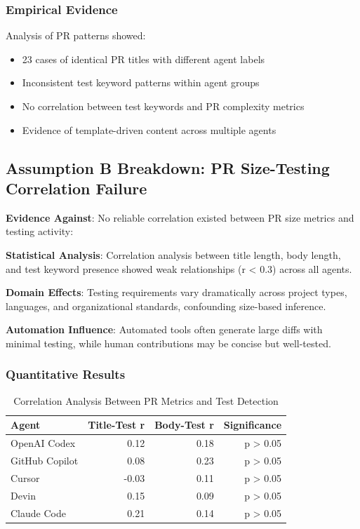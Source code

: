 \documentclass[conference]{IEEEtran}
\begin{document}
\subsubsection{Empirical Evidence}

Analysis of PR patterns showed:
\begin{itemize}
    \item 23 cases of identical PR titles with different agent labels
    \item Inconsistent test keyword patterns within agent groups
    \item No correlation between test keywords and PR complexity metrics
    \item Evidence of template-driven content across multiple agents
\end{itemize}

\subsection{Assumption B Breakdown: PR Size-Testing Correlation Failure}

\textbf{Evidence Against}: No reliable correlation existed between PR size metrics and testing activity:

\textbf{Statistical Analysis}: Correlation analysis between title length, body length, and test keyword presence showed weak relationships (r < 0.3) across all agents.

\textbf{Domain Effects}: Testing requirements vary dramatically across project types, languages, and organizational standards, confounding size-based inference.

\textbf{Automation Influence}: Automated tools often generate large diffs with minimal testing, while human contributions may be concise but well-tested.

\subsubsection{Quantitative Results}

\begin{table}[H]
\centering
\caption{Correlation Analysis Between PR Metrics and Test Detection}
\begin{tabular}{@{}lrrr@{}}
\toprule
\textbf{Agent} & \textbf{Title-Test r} & \textbf{Body-Test r} & \textbf{Significance} \\
\midrule
OpenAI Codex & 0.12 & 0.18 & p > 0.05 \\
GitHub Copilot & 0.08 & 0.23 & p > 0.05 \\
Cursor & -0.03 & 0.11 & p > 0.05 \\
Devin & 0.15 & 0.09 & p > 0.05 \\
Claude Code & 0.21 & 0.14 & p > 0.05 \\
\bottomrule
\end{tabular}
\end{table}
\end{document}
